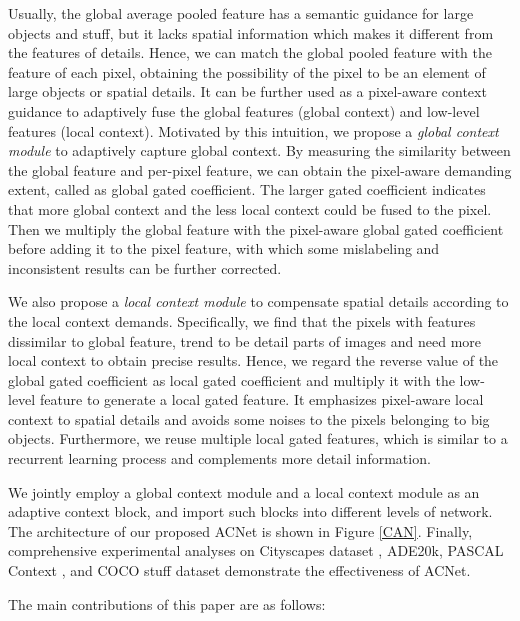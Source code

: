\documentclass[10pt,twocolumn,letterpaper]{article}
\begin{document}
Usually, the global average pooled feature has a semantic guidance for large objects and stuff, but it lacks spatial information which makes it different from the features of details. Hence, we can match the global pooled feature with the feature of each pixel, obtaining the possibility of the pixel to be an element of large objects or spatial details. It can be further used as a pixel-aware context guidance to adaptively fuse the global features (global context) and low-level features (local context). 
Motivated by this intuition, we propose a \emph{global context module} to adaptively capture global context.  By measuring the similarity between the global feature and per-pixel feature, we can obtain the pixel-aware demanding extent, called as global gated coefficient. The larger gated coefficient indicates that more global context and the less local context could be fused to the pixel. Then we multiply the global feature with the pixel-aware global gated coefficient before adding it to the pixel feature, with which some mislabeling and inconsistent results can be further corrected. 



We also propose a \emph{local context module} to compensate spatial details according to the local context demands.
Specifically, we find that the pixels with features dissimilar to global feature, trend to be detail parts of images and need more local context to obtain precise results. Hence, we regard the reverse value of the  global gated coefficient as local gated coefficient and  multiply it with the low-level feature to generate a  local gated feature. It emphasizes pixel-aware local context to spatial details and avoids some noises to the pixels belonging to big objects. Furthermore, we reuse multiple  local gated features, which is similar to a recurrent learning process and complements more detail information.

We jointly employ a global context module and a local context module as an adaptive context block, and import such blocks into different levels of network.  The architecture of our proposed ACNet is shown in Figure \ref{CAN}.  Finally, comprehensive experimental analyses on Cityscapes dataset \cite{cityscapes}, ADE20k\cite{zhou2017scene}, PASCAL Context \cite{pcontext}, and COCO stuff\cite{caesar2018coco} dataset demonstrate the effectiveness of ACNet.

The main contributions of this paper are as follows:
\end{document}
